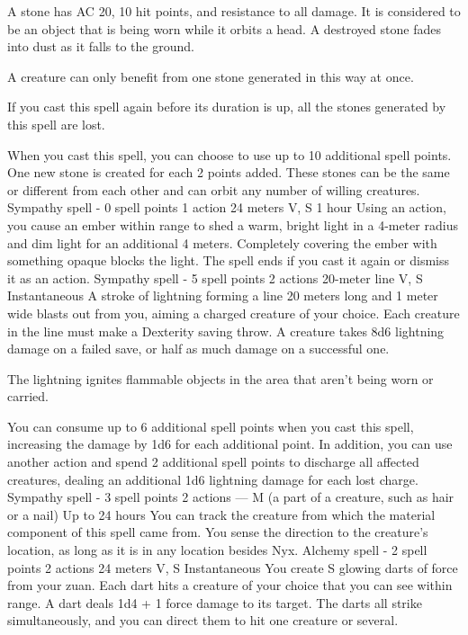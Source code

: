     A stone has AC 20, 10 hit points, and resistance to all damage.
    It is considered to be an object that is being worn while it orbits a head.
    A destroyed stone fades into dust as it falls to the ground.

    A creature can only benefit from one stone generated in this way at once.

    If you cast this spell again before its duration is up, all the stones generated by this spell are lost.

    When you cast this spell, you can choose to use up to 10 additional spell points.
    One new stone is created for each 2 points added.
    These stones can be the same or different from each other and can orbit any number of willing creatures.
    {Sympathy spell - 0 spell points}
    {1 action}
    {24 meters}
    {V, S}
    {1 hour}
    Using an action, you cause an ember within range to shed a warm, bright light in a 4-meter radius and dim light for an additional 4 meters.
    Completely covering the ember with something opaque blocks the light.
    The spell ends if you cast it again or dismiss it as an action.
    {Sympathy spell - 5 spell points}
    {2 actions}
    {20-meter line}
    {V, S}
    {Instantaneous}
    A stroke of lightning forming a line 20 meters long and 1 meter wide blasts out from you, aiming a charged creature of your choice.
    Each creature in the line must make a Dexterity saving throw.
    A creature takes 8d6 lightning damage on a failed save, or half as much damage on a successful one.

    The lightning ignites flammable objects in the area that aren't being worn or carried.

    You can consume up to 6 additional spell points when you cast this spell, increasing the damage by 1d6 for each additional point.
    In addition, you can use another action and spend 2 additional spell points to discharge all affected creatures, dealing an additional 1d6 lightning damage for each lost charge.
    {Sympathy spell - 3 spell points}
    {2 actions}
    {---}
    {M (a part of a creature, such as hair or a nail)}
    {Up to 24 hours}
    You can track the creature from which the material component of this spell came from.
    You sense the direction to the creature's location, as long as it is in any location besides Nyx.
    {Alchemy spell - 2 spell points}
    {2 actions}
    {24 meters}
    {V, S}
    {Instantaneous}
    You create S glowing darts of force from your zuan.
    Each dart hits a creature of your choice that you can see within range.
    A dart deals 1d4 + 1 force damage to its target.
    The darts all strike simultaneously, and you can direct them to hit one creature or several.

